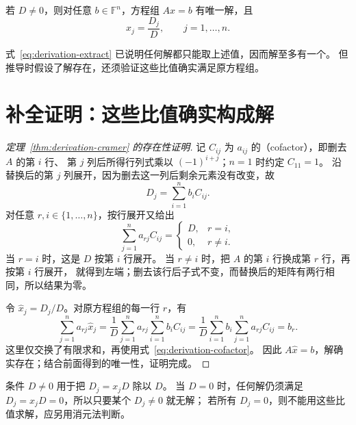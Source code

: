 \documentclass[UTF8,12pt,a4paper,fontset=fandol]{ctexart}
\begin{document}
\begin{theorem}[克拉默法则]
\label{thm:derivation-cramer}
若 $D\ne0$，则对任意 $b\in\mathbb F^n$，方程组 $Ax=b$ 有唯一解，且
\begin{equation}
  x_j=\frac{D_j}{D},\qquad j=1,\ldots,n.
  \label{eq:derivation-cramer}
\end{equation}
\end{theorem}

式~\eqref{eq:derivation-extract} 已说明任何解都只能取上述值，因而解至多有一个。
但推导时假设了解存在，还须验证这些比值确实满足原方程组。

\section{补全证明：这些比值确实构成解}

\begin{proof}[定理~\ref{thm:derivation-cramer} 的存在性证明]
记 $C_{ij}$ 为 $a_{ij}$ 的（cofactor），即删去 $A$ 的第 $i$ 行、
第 $j$ 列后所得行列式乘以 $(-1)^{i+j}$；$n=1$ 时约定 $C_{11}=1$。
沿替换后的第 $j$ 列展开，因为删去这一列后剩余元素没有改变，故
\[
  D_j=\sum_{i=1}^n b_iC_{ij}.
\]
对任意 $r,i\in\{1,\ldots,n\}$，按行展开又给出
\begin{equation}
  \sum_{j=1}^n a_{rj}C_{ij}
  =\begin{cases}D,&r=i,\\0,&r\ne i.\end{cases}
  \label{eq:derivation-cofactor}
\end{equation}
当 $r=i$ 时，这是 $D$ 按第 $i$ 行展开。
当 $r\ne i$ 时，把 $A$ 的第 $i$ 行换成第 $r$ 行，再按第 $i$ 行展开，
就得到左端；删去该行后子式不变，而替换后的矩阵有两行相同，所以结果为零。

令 $\widehat x_j=D_j/D$。对原方程组的每一行 $r$，有
\[
  \sum_{j=1}^n a_{rj}\widehat x_j
  =\frac1D\sum_{j=1}^n a_{rj}\sum_{i=1}^n b_iC_{ij}
  =\frac1D\sum_{i=1}^n b_i\sum_{j=1}^n a_{rj}C_{ij}
  =b_r.
\]
这里仅交换了有限求和，再使用式~\eqref{eq:derivation-cofactor}。
因此 $A\widehat x=b$，解确实存在；结合前面得到的唯一性，证明完成。
\end{proof}

条件 $D\ne0$ 用于把 $D_j=x_jD$ 除以 $D$。
当 $D=0$ 时，任何解仍须满足 $D_j=x_jD=0$，所以只要某个 $D_j\ne0$ 就无解；
若所有 $D_j=0$，则不能用这些比值求解，应另用消元法判断。
\end{document}
